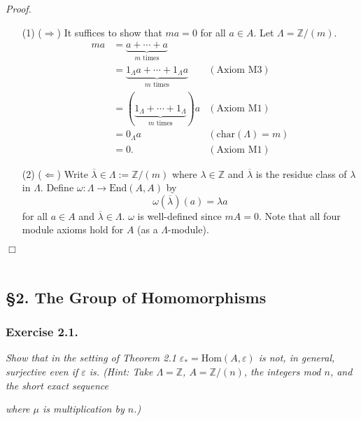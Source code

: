 \documentclass{article}
\begin{document}
\emph{Proof.}
\begin{enumerate}
\item[(1)]
  ($\Longrightarrow$)
  It suffices to show that $ma = 0$ for all $a \in A$.
  Let $\Lambda = \mathbb{Z}/(m)$.
  \begin{align*}
    ma
    &= \underbrace{a + \cdots + a}_{\text{$m$ times}} \\
    &= \underbrace{1_\Lambda a + \cdots + 1_\Lambda a}_{\text{$m$ times}}
      &(\text{Axiom M3}) \\
    &= (\underbrace{1_\Lambda + \cdots + 1_\Lambda}_{\text{$m$ times}}) a
      &(\text{Axiom M1}) \\
    &= 0_\Lambda a
      &(\mathrm{char}(\Lambda) = m) \\
    &= 0.
      &(\text{Axiom M1})
  \end{align*}

\item[(2)]
  ($\Longleftarrow$)
  Write $\overline{\lambda} \in \Lambda := \mathbb{Z}/(m)$ where
  $\lambda \in \mathbb{Z}$ and
  $\overline{\lambda}$ is the residue class of $\lambda$ in $\Lambda$.
  Define $\omega: \Lambda \to \mathrm{End}(A, A)$
  by
  \[
    \omega(\overline{\lambda})(a) = \lambda a
  \]
  for all $a \in A$ and $\overline{\lambda} \in \Lambda$.
  $\omega$ is well-defined since $mA = 0$.
  Note that all four module axioms hold for $A$ (as a $\Lambda$-module).
\end{enumerate}
$\Box$ \\\\






\subsection*{\S 2. The Group of Homomorphisms \\}



\subsubsection*{Exercise 2.1.}
\emph{Show that in the setting of Theorem 2.1
$\varepsilon_{*} = \mathrm{Hom}(A,\varepsilon)$ is not, in general, surjective
even if $\varepsilon$ is.
(Hint: Take $\Lambda = \mathbb{Z}$, $A = \mathbb{Z}/(n)$, the integers mod $n$,
and the short exact sequence}
\emph{where $\mu$ is multiplication by $n$.)} \\
\end{document}
